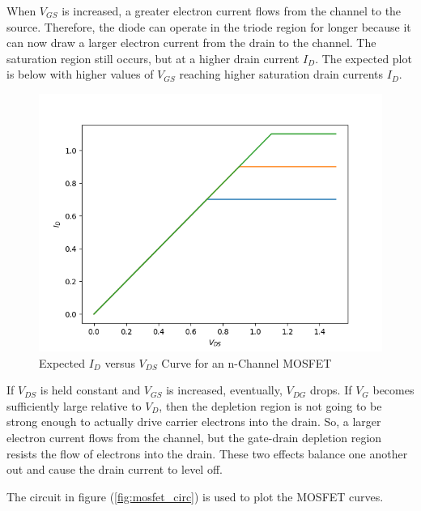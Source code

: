 When $V_{GS}$ is increased, a greater electron current flows from the channel to the source. Therefore, the diode can operate in the triode region for longer because it can now draw a larger electron current from the drain to the channel. The saturation region still occurs, but at a higher drain current $I_D$. The expected plot is below with higher values of $V_{GS}$ reaching higher saturation drain currents $I_D$.


\FloatBarrier

\begin{figure}[h!]
	\centering
	\includegraphics[scale=0.75]{../images/id_vs_vds.PNG}
	\caption{Expected $I_D$ versus $V_{DS}$ Curve for an n-Channel MOSFET}
	\label{fig:id_vs_vds}
\end{figure}

\FloatBarrier

If $V_{DS}$ is held constant and $V_{GS}$ is increased, eventually, $V_{DG}$ drops. If $V_{G}$ becomes sufficiently large relative to $V_{D}$, then the depletion region is not going to be strong enough to actually drive carrier electrons into the drain. So, a larger electron current flows from the channel, but the gate-drain depletion region resists the flow of electrons into the drain. These two effects balance one another out and cause the drain current to level off.

The circuit in figure (\ref{fig:mosfet_circ}) is used to plot the MOSFET curves.

